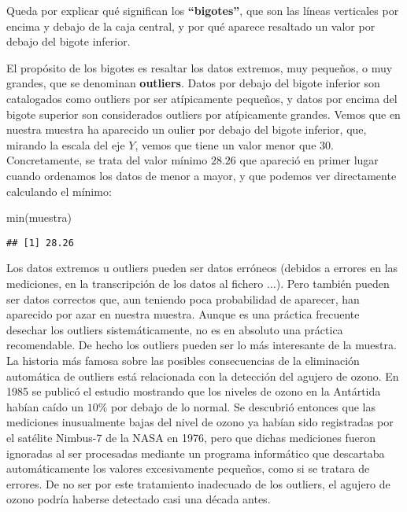 \documentclass[
  degree=mecinf,
  title=normal,
  toc=normal,
  bib=normal]{mnye}
\newenvironment{Shaded}{\begin{snugshade}}{\end{snugshade}}
\newcommand{\FunctionTok}[1]{\textcolor[rgb]{0.00,0.00,0.00}{#1}}
\newcommand{\NormalTok}[1]{#1}
\begin{document}
Queda por explicar qué significan los \textbf{``bigotes''}, que son las líneas verticales por encima y debajo de la caja central, y por qué aparece resaltado un valor por debajo del bigote inferior.

El propósito de los bigotes es resaltar los datos extremos, muy pequeños, o muy grandes, que se denominan \textbf{outliers}. Datos por debajo del bigote inferior son catalogados como outliers por ser atípicamente pequeños, y datos por encima del bigote superior son considerados outliers por atípicamente grandes. Vemos que en nuestra muestra ha aparecido un oulier por debajo del bigote inferior, que, mirando la escala del eje \(Y\), vemos que tiene un valor menor que \(30\). Concretamente, se trata del valor mínimo \(28.26\) que apareció en primer lugar cuando ordenamos los datos de menor a mayor, y que podemos ver directamente calculando el mínimo:

\begin{Shaded}
\begin{Highlighting}[]
\FunctionTok{min}\NormalTok{(muestra)}
\end{Highlighting}
\end{Shaded}

\begin{verbatim}
## [1] 28.26
\end{verbatim}

Los datos extremos u outliers pueden ser datos erróneos (debidos a errores en las mediciones, en la transcripción de los datos al fichero \(\dotsc\)). Pero también pueden ser datos correctos que, aun teniendo poca probabilidad de aparecer, han aparecido por azar en nuestra muestra. Aunque es una práctica frecuente desechar los outliers sistemáticamente, no es en absoluto una práctica recomendable. De hecho los outliers pueden ser lo más interesante de la muestra. La historia más famosa sobre las posibles consecuencias de la eliminación automática de outliers está relacionada con la detección del agujero de ozono. En 1985 se publicó el estudio mostrando que los niveles de ozono en la Antártida habían caído un \(10\%\) por debajo de lo normal. Se descubrió entonces que las mediciones inusualmente bajas del nivel de ozono ya habían sido registradas por el satélite Nimbus-7 de la NASA en 1976, pero que dichas mediciones fueron ignoradas al ser procesadas mediante un programa informático que descartaba automáticamente los valores excesivamente pequeños, como si se tratara de errores. De no ser por este tratamiento inadecuado de los outliers, el agujero de ozono podría haberse detectado casi una década antes.
\end{document}
